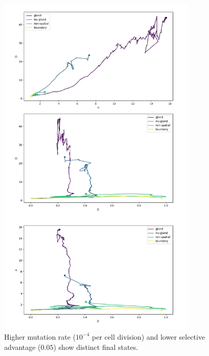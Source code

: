 \begin{figure}[h!]
    \centering
    \includegraphics[width=0.85\textwidth]{Chapter_3/figures/1e04005.pdf}
    \caption{Higher mutation rate ($10^{-4}$ per cell division) and lower
    selective advantage ($0.05$) show distinct final states. }
    \label{fig:1e04_005}
\end{figure}
\clearpage

